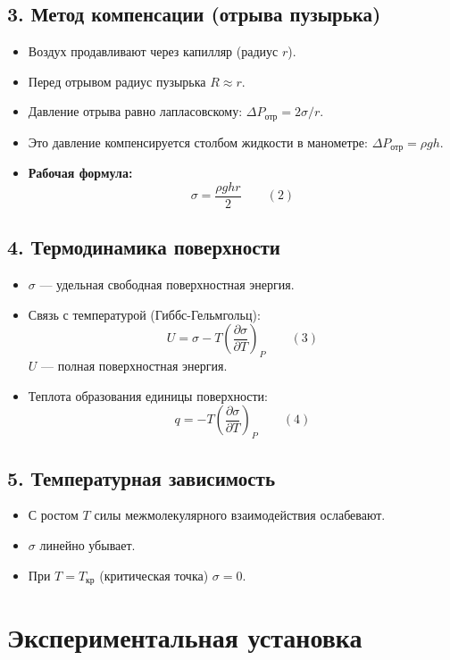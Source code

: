 \documentclass[a4paper, 12pt]{article}
\begin{document}
\subsection*{3. Метод компенсации (отрыва пузырька)}
\begin{itemize}
    \item Воздух продавливают через капилляр (радиус $r$).
    \item Перед отрывом радиус пузырька $R \approx r$.
    \item Давление отрыва равно лапласовскому: $\Delta P_{\text{отр}} = 2\sigma / r$.
    \item Это давление компенсируется столбом жидкости в манометре: $\Delta P_{\text{отр}} = \rho g h$.
    \item \textbf{Рабочая формула:}
    \[
    \boxed{\sigma = \frac{\rho g h r}{2}} \qquad (2)
    \]
\end{itemize}

\subsection*{4. Термодинамика поверхности}
\begin{itemize}
    \item $\sigma$ — удельная свободная поверхностная энергия.
    \item Связь с температурой (Гиббс-Гельмгольц):
    \[
    U = \sigma - T \left( \frac{\partial \sigma}{\partial T} \right)_P \qquad (3)
    \]
    $U$ — полная поверхностная энергия.
    \item Теплота образования единицы поверхности:
    \[
    q = -T \left( \frac{\partial \sigma}{\partial T} \right)_P \qquad (4)
    \]
\end{itemize}

\subsection*{5. Температурная зависимость}
\begin{itemize}
    \item С ростом $T$ силы межмолекулярного взаимодействия ослабевают.
    \item $\sigma$ линейно убывает.
    \item При $T = T_{\text{кр}}$ (критическая точка) $\sigma = 0$.
\end{itemize}

\section{Экспериментальная установка}
\end{document}
